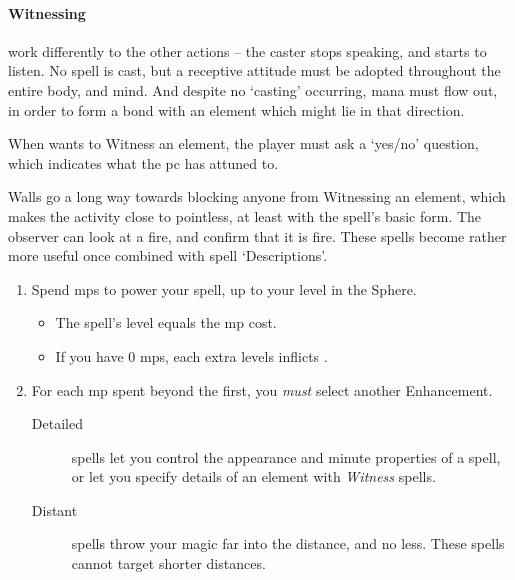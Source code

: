 \begin{multicols}{2}
\paragraph{Witnessing}
work differently to the other actions -- the caster stops speaking, and starts to listen.
No spell is cast, but a receptive attitude must be adopted throughout the entire body, and mind.
And despite no `casting' occurring, mana must flow out, in order to form a bond with an element which might lie in that direction.

When  wants to Witness an element, the player must ask a `yes/no' question, which indicates what the \gls{pc} has attuned to.

Walls go a long way towards blocking anyone from Witnessing an element, which makes the activity close to pointless, at least with the spell's basic form.
The observer can look at a fire, and confirm that it is fire.
These spells become rather more useful once combined with spell `Descriptions'.

\begin{enumerate}
  \item
  Spend \glspl{mp} to power your spell, up to your level in the Sphere.
  \begin{itemize}
    \item
    The spell's level equals the \gls{mp} cost.
    \item
    If you have 0 \glspl{mp}, each extra levels inflicts .
  \end{itemize}
  \item
  For each \gls{mp} spent beyond the first, you \emph{must} select another Enhancement.
  \begin{description}
    \item[Detailed]
    spells let you control the appearance and minute properties of a spell, or let you specify details of an element with \textit{Witness} spells. 
    \item[Distant]
    spells throw your magic far into the distance, and no less.
    These spells cannot target shorter distances.


\end{description}
\end{enumerate}
\end{multicols}
